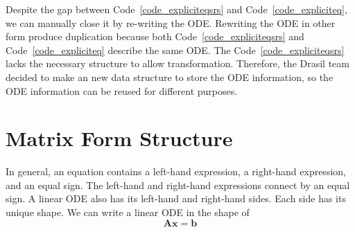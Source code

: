 Despite the gap between Code~\ref{code_expliciteqsrs} and Code~\ref{code_expliciteq}, we can manually close it by re-writing the ODE. Rewriting the ODE in other form produce duplication because both Code~\ref{code_expliciteqsrs} and Code~\ref{code_expliciteq} describe the same ODE. The Code~\ref{code_expliciteqsrs} lacks the necessary structure to allow transformation. Therefore, the Drasil team decided to make an new data structure to store the ODE information, so the ODE information can be reused for different purposes.



\section{Matrix Form Structure}
In general, an equation contains a left-hand expression, a right-hand expression, and an equal sign. The left-hand and right-hand expressions connect by an equal sign. A linear ODE also has its left-hand and right-hand sides. Each side has its unique shape. We can write a linear ODE in the shape of
\begin{equation} \label{eq_matrixform}
	\boldsymbol{Ax} = \boldsymbol{b}
\end{equation}

